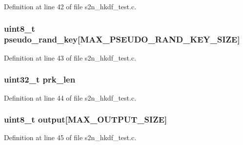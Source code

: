 Definition at line 42 of file s2n\+\_\+hkdf\+\_\+test.\+c.

\subsubsection[{\texorpdfstring{pseudo\+\_\+rand\+\_\+key}{pseudo_rand_key}}]{\setlength{\rightskip}{0pt plus 5cm}uint8\+\_\+t pseudo\+\_\+rand\+\_\+key\mbox{[}{\bf M\+A\+X\+\_\+\+P\+S\+E\+U\+D\+O\+\_\+\+R\+A\+N\+D\+\_\+\+K\+E\+Y\+\_\+\+S\+I\+ZE}\mbox{]}}\hypertarget{structhkdf__test__vector_aa1c8395b21f400e367891c731063d2b9}{}\label{structhkdf__test__vector_aa1c8395b21f400e367891c731063d2b9}


Definition at line 43 of file s2n\+\_\+hkdf\+\_\+test.\+c.

\subsubsection[{\texorpdfstring{prk\+\_\+len}{prk_len}}]{\setlength{\rightskip}{0pt plus 5cm}uint32\+\_\+t prk\+\_\+len}\hypertarget{structhkdf__test__vector_ab2af0084520eaeac6ed5d0fe2bad1b96}{}\label{structhkdf__test__vector_ab2af0084520eaeac6ed5d0fe2bad1b96}


Definition at line 44 of file s2n\+\_\+hkdf\+\_\+test.\+c.

\subsubsection[{\texorpdfstring{output}{output}}]{\setlength{\rightskip}{0pt plus 5cm}uint8\+\_\+t output\mbox{[}{\bf M\+A\+X\+\_\+\+O\+U\+T\+P\+U\+T\+\_\+\+S\+I\+ZE}\mbox{]}}\hypertarget{structhkdf__test__vector_ad90e7e2e9491902d6b4f4ebbce6c56b1}{}\label{structhkdf__test__vector_ad90e7e2e9491902d6b4f4ebbce6c56b1}


Definition at line 45 of file s2n\+\_\+hkdf\+\_\+test.\+c.

